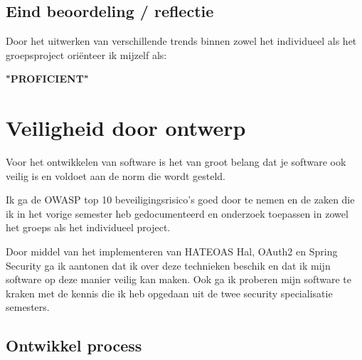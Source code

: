 \subsection{Eind beoordeling / reflectie}
Door het uitwerken van verschillende trends binnen zowel het individueel als het groepsproject oriënteer ik mijzelf
als:\\
\par\vspace{10pt}\textbf{\uppercase{"Proficient"}}\\




\newpage
\section{Veiligheid door ontwerp}\label{sec:veiligheid-door-ontwerp}

Voor het ontwikkelen van software is het van groot belang dat je software ook veilig is en voldoet aan de norm die
wordt gesteld.

Ik ga de OWASP top 10 beveiligingsrisico's goed door te nemen en de zaken die ik in het vorige semester heb
gedocumenteerd en onderzoek toepassen in zowel het groeps als het individueel project.

Door middel van het implementeren van HATEOAS Hal, OAuth2 en Spring Security ga ik aantonen dat ik over deze
technieken beschik en dat ik mijn software op deze manier veilig kan maken.
Ook ga ik proberen mijn software te kraken met de kennis die ik heb opgedaan uit de twee security specialisatie
semesters.


\subsection{Ontwikkel process}
